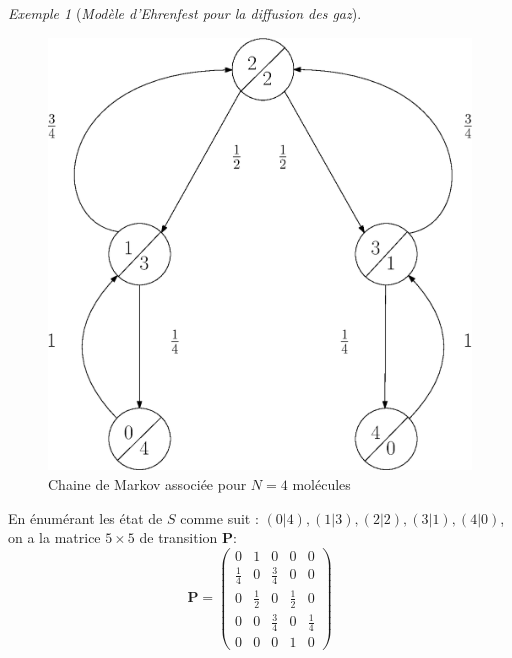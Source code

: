 \documentclass[12pt,a4paper]{report}
\theoremstyle{definition}
\theoremstyle{remark}
\newtheorem{example}{Exemple}[chapter]
\begin{document}
\begin{example}[\textit{Modèle d'Ehrenfest pour la diffusion des gaz}]
\begin{figure}[H]
		\includegraphics[scale=0.4]{figures/Ehrenfest.eps}
		\caption{Chaine de Markov associée pour $N=4$ molécules}
		\label{ehrenfestMC}
	\end{figure}
	En énumérant les état de $S$ comme suit : $(0|4), (1|3), (2|2), (3|1), (4|0)$, on a la matrice $5\times5$ de transition $\textbf{P}$:
	\[
		\textbf{P} =
			\begin{pmatrix}
			0 & 1 & 0 & 0 & 0 \\
			\frac{1}{4} & 0 & \frac{3}{4}& 0 & 0 \\
			0 & \frac{1}{2} & 0 & \frac{1}{2} & 0 \\
			0 & 0 & \frac{3}{4} & 0 & \frac{1}{4} \\
			0 & 0 & 0 & 1 & 0
			\end{pmatrix}
	\]
\end{example}
\end{document}

